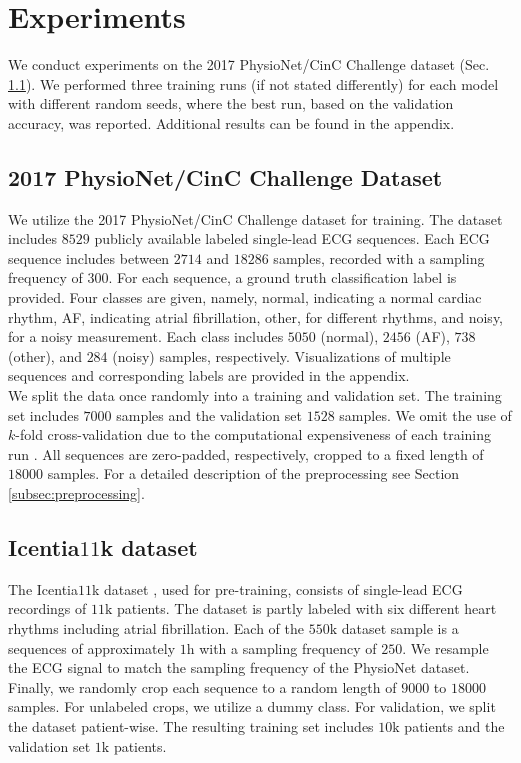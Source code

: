 \section{Experiments} \label{sec:experiments}

We conduct experiments on the 2017 PhysioNet/CinC Challenge dataset \cite{Clifford2017} (Sec. \ref{subsec:physionet_dataset}). We performed three training runs (if not stated differently) for each model with different random seeds, where the best run, based on the validation accuracy, was reported. Additional results can be found in the appendix.

\subsection{2017 PhysioNet/CinC Challenge Dataset} \label{subsec:physionet_dataset}

We utilize the 2017 PhysioNet/CinC Challenge dataset \cite{Clifford2017} for training. The dataset includes $8529$ publicly available labeled single-lead ECG sequences. Each ECG sequence includes between $2714$ and $18286$ samples, recorded with a sampling frequency of $300$. For each sequence, a ground truth classification label is provided. Four classes are given, namely, normal, indicating a normal cardiac rhythm, AF, indicating atrial fibrillation, other, for different rhythms, and noisy, for a noisy measurement. Each class includes $5050$ (normal), $2456$ (AF), $738$ (other), and $284$ (noisy) samples, respectively. Visualizations of multiple sequences and corresponding labels are provided in the appendix. \\
\indent We split the data once randomly into a training and validation set. The training set includes $7000$ samples and the validation set $1528$ samples. We omit the use of $k$-fold cross-validation due to the computational expensiveness of each training run \cite{Bishop2006, Goodfellow2016}. All sequences are zero-padded, respectively, cropped to a fixed length of $18000$ samples. For a detailed description of the preprocessing see Section \ref{subsec:preprocessing}.

\subsection{Icentia$11$k dataset} \label{subsec:icentia11k_dataset}

The Icentia$11$k dataset \cite{Tan2019}, used for pre-training, consists of single-lead ECG recordings of $11\si{\kilo}$ patients. The dataset is partly labeled with six different heart rhythms including atrial fibrillation. Each of the $550\si{\kilo}$ dataset sample is a sequences of approximately $1\si{\hour}$ with a sampling frequency of $250$. We resample the ECG signal to match the sampling frequency of the PhysioNet dataset. Finally, we randomly crop each sequence to a random length of $9000$ to $18000$ samples. For unlabeled crops, we utilize a dummy class. For validation, we split the dataset patient-wise. The resulting training set includes $10\si{\kilo}$ patients and the validation set $1\si{\kilo}$ patients.

